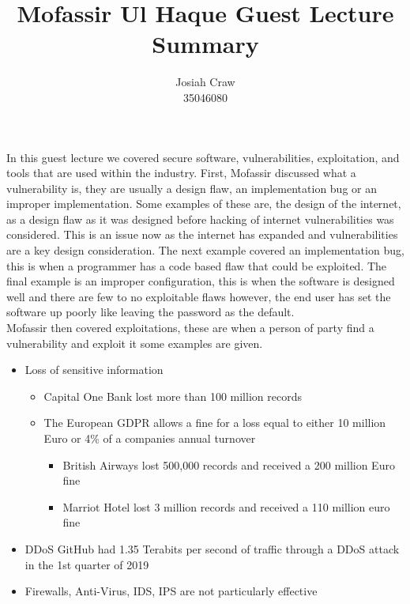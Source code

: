 \documentclass{article}
\title{Mofassir Ul Haque Guest Lecture Summary}
\author{Josiah Craw\\35046080}
\begin{document}
\maketitle{}

In this guest lecture we covered secure software, vulnerabilities, exploitation, and tools that 
are used within the industry. First, Mofassir discussed what a vulnerability is, they are usually
a design flaw, an implementation bug or an improper implementation. Some examples of these are,
the design of the internet, as a design flaw as it was designed before hacking of internet
vulnerabilities was considered. This is an issue now as the internet has expanded and
vulnerabilities are a key design consideration. The next example covered an implementation bug,
this is when a programmer has a code based flaw that could be exploited. The final example is an
improper configuration, this is when the software is designed well and there are few to no
exploitable flaws however, the end user has set the software up poorly like leaving the password
as the default.\\

Mofassir then covered exploitations, these are when a person of party find a vulnerability and
exploit it some examples are given.

\begin{itemize}
    
    \item{Loss of sensitive information}

        \begin{itemize}
            
            \item{Capital One Bank lost more than 100 million records}

            \item{The European GDPR allows a fine for a loss equal to either 10 million Euro or
                4\% of a companies annual turnover}
                \begin{itemize}
                    
                    \item{British Airways lost 500,000 records and received a 200 million Euro fine}
                        
                    \item{Marriot Hotel lost 3 million records and received a 110 million euro
                        fine}

                \end{itemize}
        
        \end{itemize}
        
        \item{DDoS GitHub had 1.35 Terabits per second of traffic through a DDoS attack in the 1st
            quarter of 2019}

        \item{Firewalls, Anti-Virus, IDS, IPS are not particularly effective}

\end{itemize}
\end{document}
